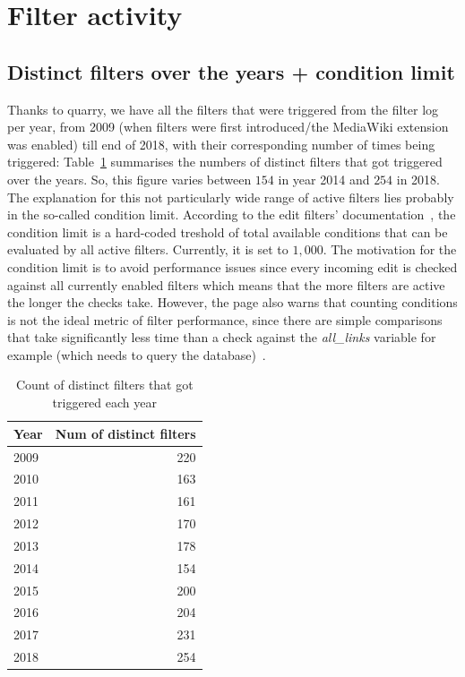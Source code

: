 \section{Filter activity}

\subsection{Distinct filters over the years + condition limit}
Thanks to quarry, we have all the filters that were triggered from the filter log per year, %
from 2009 (when filters were first introduced/the MediaWiki extension was enabled) till end of 2018, with their corresponding number of times being triggered:
Table~\ref{tab:active-filters-count} summarises the numbers of distinct filters that got triggered over the years.
So, this figure varies between $154$ in year 2014 and $254$ in 2018.
The explanation for this not particularly wide range of active filters lies probably in the so-called condition limit.
According to the edit filters' documentation~\cite{Wikipedia:EditFilterDocumentation}, the condition limit is a hard-coded treshold of total available conditions that can be evaluated by all active filters.
Currently, it is set to $1,000$.
The motivation for the condition limit is to avoid performance issues since every incoming edit is checked against all currently enabled filters which means that the more filters are active the longer the checks take.
However, the page also warns that counting conditions is not the ideal metric of filter performance, since there are simple comparisons that take significantly less time than a check against the \emph{all\_links} variable for example (which needs to query the database)~\cite{Wikipedia:EditFilterDocumentation}.

\begin{table}
  \centering
  \begin{tabular}{l r }
    Year & Num of distinct filters \\
    \hline
    2009 & 220 \\
    2010 & 163 \\
    2011 & 161 \\
    2012 & 170 \\
    2013 & 178 \\
    2014 & 154 \\
    2015 & 200 \\
    2016 & 204 \\
    2017 & 231 \\
    2018 & 254 \\
  \end{tabular}
  \caption{Count of distinct filters that got triggered each year}~\label{tab:active-filters-count}
\end{table}

